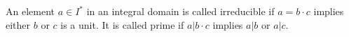 An element $a \in I^*$ in an integral domain is called irreducible if $a = b \cdot c$ implies either $b$ or $c$ is a unit. It is called prime if $a | b \cdot c$ implies $a | b$ or $a | c$.
